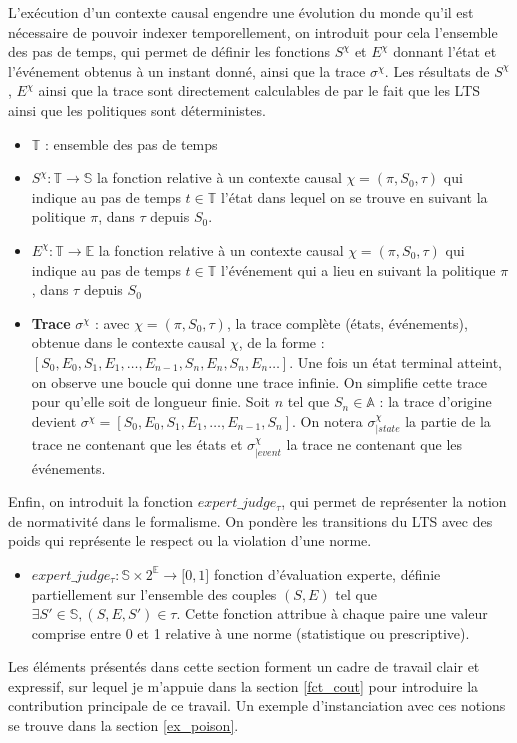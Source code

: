 L'exécution d'un contexte causal engendre une évolution du monde qu'il est nécessaire de pouvoir indexer temporellement, on introduit pour cela l'ensemble des pas de temps, qui permet de définir les fonctions $S^\chi$ et $E^\chi$ donnant l'état et l'événement obtenus à un instant donné, ainsi que la trace $\sigma^\chi$. Les résultats de $S^\chi$, $E^\chi$ ainsi que la trace sont directement calculables de par le fait que les LTS ainsi que les politiques sont déterministes. 

\begin{itemize}
    \item $\mathds{T}$ : ensemble des pas de temps
    
    \item $S^\chi: \mathds{T}\to \mathds{S}$ la fonction relative à un contexte causal $\chi = (\pi,S_0,\tau)$ qui indique au pas de temps $t\in \mathds{T}$ l'état dans lequel on se trouve en suivant la politique $\pi$, dans $\tau$ depuis $S_0$.

    \item $E^\chi: \mathds{T}\to \mathds{E}$ la fonction relative à un contexte causal $\chi = (\pi,S_0,\tau)$ qui indique au pas de temps $t\in \mathds{T}$ l'événement qui a lieu en suivant la politique $\pi$, dans $\tau$ depuis $S_0$
    
    \item \textbf{Trace} $\sigma^\chi$ : avec $\chi = (\pi,S_0,\tau)$, la trace complète (états, événements), obtenue dans le contexte causal $\chi$, de la forme : $[S_0,E_0,S_1,E_1,\dots,E_{n-1},S_n,E_n,S_n,E_n\dots] $. Une fois un état terminal atteint, on observe une boucle qui donne une trace infinie. On simplifie cette trace pour qu'elle soit de longueur finie. Soit $n$ tel que $S_n\in \mathds{A}$ : la trace d'origine devient $\sigma^\chi=[S_0,E_0,S_1,E_1,\dots,E_{n-1},S_n]$. On notera $\sigma^{\chi}_{|state}$ la partie de la trace ne contenant que les états et $\sigma^{\chi}_{|event}$ la trace ne contenant que les événements.
    
\end{itemize}


Enfin, on introduit la fonction $expert\_judge_\tau$, qui permet de représenter la notion de normativité dans le formalisme. On pondère les transitions du LTS avec des poids qui représente le respect ou la violation d'une norme.
\begin{itemize}
    \item $expert\_judge_\tau: \mathds{S} \times 2 ^{\mathds{E}}\to \lbrack 0, 1\rbrack$ fonction d'évaluation experte, définie partiellement sur l'ensemble des couples $(S,E)$ tel que $\exists S'\in\mathds{S},(S,E,S')\in \tau$. Cette fonction attribue à chaque paire une valeur comprise entre 0 et 1 relative à une norme (statistique ou prescriptive).
\end{itemize}

Les éléments présentés dans cette section forment un cadre de travail clair et expressif, sur lequel je m'appuie dans la section \ref{fct_cout} pour introduire la contribution principale de ce travail. Un exemple d'instanciation avec ces notions se trouve dans la section \ref{ex_poison}.